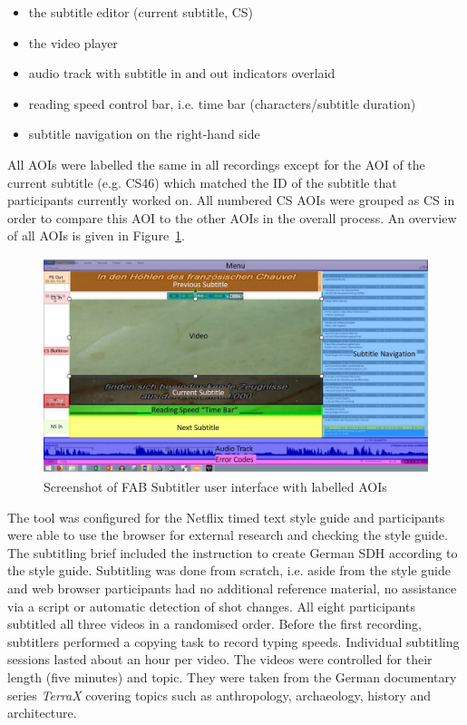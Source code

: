 \documentclass[output=paper]{langscibook}
\begin{document}
\begin{itemize}
\item the subtitle editor (current subtitle, CS)
\item the video player
\item audio track with subtitle in and out indicators overlaid
\item reading speed control bar, i.e.
time bar (characters/subtitle duration)
\item subtitle navigation on the right-hand side
\end{itemize}
All AOIs were labelled the same in all recordings except for the AOI of the current subtitle (e.g.
CS46) which matched the ID of the subtitle that participants currently worked on.
All numbered CS AOIs were grouped as CS in order to compare this AOI to the other AOIs in the overall process.
An overview of all AOIs is given in Figure~\ref{fig:1_AOIs}.

\begin{figure}
\includegraphics[width=1\textwidth]{figures/AOIs_2.jpg}
\caption{Screenshot of FAB Subtitler user interface with labelled AOIs\label{fig:1_AOIs}}
\end{figure}

The tool was configured for the Netflix timed text style guide and participants were able to use the browser for external research and checking the style guide.
The subtitling brief included the instruction to create German SDH according to the style guide.
Subtitling was done from scratch, i.e.
aside from the style guide and web browser participants had no additional reference material, no assistance via a script or automatic detection of shot changes.
All eight participants subtitled all three videos in a randomised order.
Before the first recording, subtitlers performed a copying task to record typing speeds.
Individual subtitling sessions lasted about an hour per video.
The videos were controlled for their length (five minutes) and topic.
They were taken from the German documentary series \textit{TerraX} covering topics such as anthropology, archaeology, history and architecture.
\end{document}
